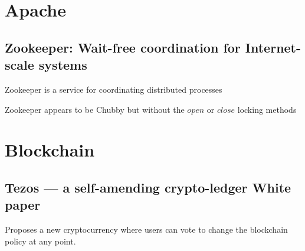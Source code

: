 \documentclass[a4paper]{article}
\begin{document}
\section{Apache}

\subsection{Zookeeper: Wait-free coordination for Internet-scale systems}

Zookeeper is a service for coordinating distributed processes

Zookeeper appears to be Chubby but without the $open$ or $close$ locking methods

\section{Blockchain}

\subsection{Tezos — a self-amending crypto-ledger White paper}

Proposes a new cryptocurrency where users can vote to change the blockchain policy at any point.
\end{document}
